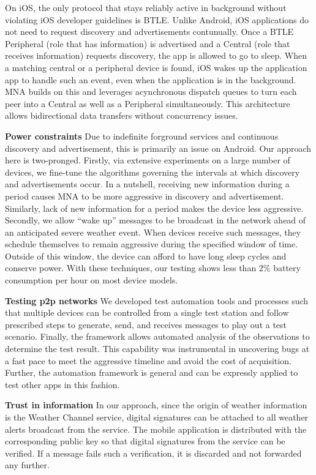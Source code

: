 \documentclass[conference]{IEEEtran}
\begin{document}
On iOS, the only protocol that stays reliably active in background
without violating iOS developer guidelines is BTLE. Unlike Android,
iOS applications do not need to request discovery and advertisements
contunually. Once a BTLE Peripheral (role that has information) is
advertised and a Central (role that receives information) requests
discovery, the app is allowed to go to sleep. When a matching central
or a peripheral device is found, iOS wakes up the application app to
handle such an event, even when the application is in the
background. MNA builds on this and leverages acynchronous dispatch
queues to turn each peer into a Central as well as a Peripheral
simultaneously. This architecture allows bidirectional data transfers
without concurrency issues.

\noindent\textbf{Power constraints} Due to indefinite forground
services and continuous discovery and advertisement, this is primarily
an issue on Android. Our approach here is two-pronged. Firstly, via
extensive experiments on a large number of devices, we fine-tune the
algorithms governing the intervals at which discovery and
advertisements occur. In a nutshell, receiving new information during
a period causes MNA to be more aggressive in discovery and
advertisement. Similarly, lack of new information for a period makes
the device less aggressive. Secondly, we allow ``wake up'' messages to
be broadcast in the network ahead of an anticipated severe weather
event. When devices receive such messages, they schedule themselves to
remain aggressive during the specified window of time. Outside of this
window, the device can afford to have long sleep cycles and conserve
power. With these techniques, our testing shows less than 2\% battery
consumption per hour on most device models.

\noindent\textbf{Testing p2p networks}
We developed test automation tools and processes such that multiple
devices can be controlled from a single test station and follow
prescribed steps to generate, send, and receives messages to play out
a test scenario. Finally, the framework allows automated analysis of
the observations to determine the test result. This capability was
instrumental in uncovering bugs at a fast pace to meet the aggressive
timeline and avoid the cost of acquisition. Further, the automation
framework is general and can be expressly applied to test other apps
in this fashion.


\noindent\textbf{Trust in information} In our approach, since the
origin of weather information is the Weather Channel service, digital
signatures can be attached to all weather alerts broadcast from the
service. The mobile application is distributed with the corresponding
public key so that digital signatures from the service can be
verified. If a message fails such a verification, it is discarded and
not forwarded any further.
\end{document}
